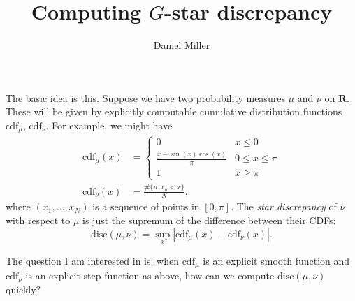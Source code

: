 \documentclass{article}
\title{Computing $G$-star discrepancy}
\author{Daniel Miller}
\newcommand{\bR}{\mathbf{R}}
\newcommand{\cdf}{\mathrm{cdf}}
\newcommand{\disc}{\mathrm{disc}}
\begin{document}
\maketitle





The basic idea is this. Suppose we have two probability measures 
$\mu$ and $\nu$ on $\bR$. These will be given by explicitly computable 
cumulative distribution functions $\cdf_\mu$, $\cdf_\nu$. For example, we might 
have 
\begin{align*}
	\cdf_\mu(x) &= \begin{cases} 0 & x\leqslant 0 \\ \frac{x-\sin(x)\cos(x)}{\pi} & 0\leqslant x \leqslant \pi \\ 1 & x\geqslant \pi\end{cases} \\
	\cdf_\nu(x) &= \frac{\#\{n : x_n <x\}}{N} ,
\end{align*}
where $(x_1,\dots,x_N)$ is a sequence of points in $[0,\pi]$. The 
\emph{star discrepancy} of $\nu$ with respect to $\mu$ is just the supremum of 
the difference between their CDFs:
\[
	\disc(\mu,\nu) = \sup_x |\cdf_\mu(x)-\cdf_\nu(x)| .
\]

The question I am interested in is: when $\cdf_\mu$ is an explicit smooth 
function and $\cdf_\nu$ is an explicit step function as above, how can we 
compute $\disc(\mu,\nu)$ quickly?
\end{document}
